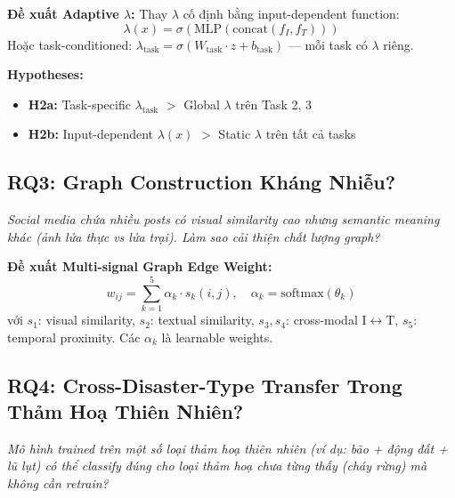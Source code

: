 \documentclass[12pt,a4paper]{article}
\begin{document}
\textbf{Đề xuất Adaptive $\lambda$:} Thay $\lambda$ cố định bằng input-dependent function:
\begin{equation}
\lambda(x) = \sigma\!\left(\text{MLP}\!\left(\text{concat}(f_I, f_T)\right)\right)
\end{equation}
Hoặc task-conditioned: $\lambda_{\text{task}} = \sigma(W_{\text{task}} \cdot z + b_{\text{task}})$ — mỗi task có $\lambda$ riêng.

\textbf{Hypotheses:}
\begin{itemize}
  \item \textbf{H2a:} Task-specific $\lambda_{\text{task}}$ $>$ Global $\lambda$ trên Task 2, 3
  \item \textbf{H2b:} Input-dependent $\lambda(x)$ $>$ Static $\lambda$ trên tất cả tasks
\end{itemize}

\subsection{RQ3: Graph Construction Kháng Nhiễu?}

\begin{noveltybox}
\textit{Social media chứa nhiều posts có visual similarity cao nhưng semantic meaning khác (ảnh lửa thực vs lửa trại). Làm sao cải thiện chất lượng graph?}
\end{noveltybox}

\textbf{Đề xuất Multi-signal Graph Edge Weight:}
\begin{equation}
w_{ij} = \sum_{k=1}^{5} \alpha_k \cdot s_k(i,j), \quad \alpha_k = \text{softmax}(\theta_k)
\label{eq:multisignal}
\end{equation}
với $s_1$: visual similarity, $s_2$: textual similarity, $s_3, s_4$: cross-modal I$\leftrightarrow$T, $s_5$: temporal proximity. Các $\alpha_k$ là learnable weights.

\subsection{RQ4: Cross-Disaster-Type Transfer Trong Thảm Hoạ Thiên Nhiên?}

\begin{noveltybox}
\textit{Mô hình trained trên một số loại thảm hoạ thiên nhiên (ví dụ: bão + động đất + lũ lụt) có thể classify đúng cho loại thảm hoạ chưa từng thấy (cháy rừng) mà không cần retrain?}
\end{noveltybox}
\end{document}

